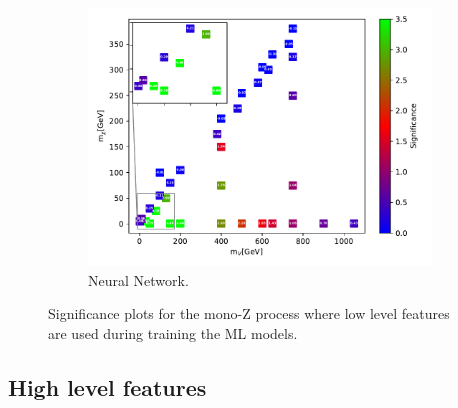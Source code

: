\begin{figure}[H]
    \begin{subfigure}[t!]{0.49\textwidth}
    \includegraphics[width = \textwidth]{Figures/Significances/significance_NN_monoZ_Low_level.pdf}
    \caption{Neural Network.}
        \label{fig:signLowmonoZNN}
    \end{subfigure}
    \caption{Significance plots for the mono-Z process where low level features are used during training the ML models.}
    \label{fig:signLowmonoZ}
\end{figure}


\subsection{High level features}

